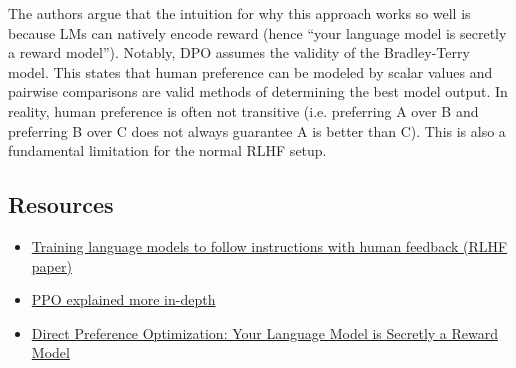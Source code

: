 \documentclass[12pt]{article}
\begin{document}
The authors argue that the intuition for why this approach works so well is because LMs can natively encode reward (hence \enquote{your language model is secretly a reward model}). Notably, DPO assumes the validity of the Bradley-Terry model. This states that human preference can be modeled by scalar values and pairwise comparisons are valid methods of determining the best model output. In reality, human preference is often not transitive (i.e. preferring A over B and preferring B over C does not always guarantee A is better than C). This is also a fundamental limitation for the normal RLHF setup. 

\subsection{Resources}
\begin{itemize}
    \item \href{https://arxiv.org/pdf/2203.02155}{Training language models to follow instructions with human feedback (RLHF paper)}
    
    \item \href{https://huggingface.co/blog/deep-rl-ppo}{PPO explained more in-depth}

    \item \href{https://arxiv.org/pdf/2305.18290}{Direct Preference Optimization: Your Language Model is Secretly a Reward Model}
\end{itemize}

\end{document}
